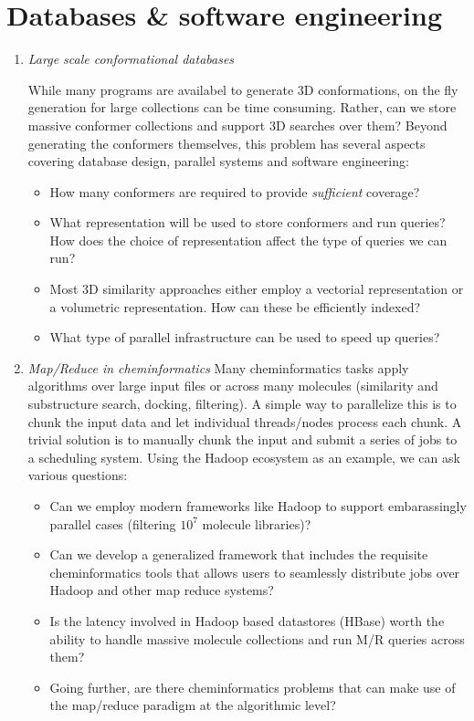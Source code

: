 \documentclass{sig-alternate}
\begin{document}
\section*{Databases \& software engineering}
\begin{enumerate}
\item \emph{Large scale conformational databases}

  While many programs are availabel to generate 3D conformations, on
  the fly generation for large collections can be time
  consuming. Rather, can we store massive conformer collections and
  support 3D searches over them? Beyond generating the conformers
  themselves, this problem has several aspects covering database
  design, parallel systems and software engineering:
  \begin{itemize}
  \item How many conformers are required to provide \emph{sufficient} coverage?
  \item What representation will be used to store conformers and run
    queries? How does the choice of representation affect the type of
    queries we can run?
  \item Most 3D similarity approaches either employ a vectorial
    representation or a volumetric representation. How can these be
    efficiently indexed?
  \item What type of parallel infrastructure can be used to speed up queries?
  \end{itemize}

\item \emph{Map/Reduce in cheminformatics}
  Many cheminformatics tasks apply algorithms over large input files
  or across many molecules (similarity and substructure search,
  docking, filtering). A simple way to parallelize this is to chunk
  the input data and let individual threads/nodes process each chunk. A
  trivial solution is to manually chunk the input and submit a series
  of jobs to a scheduling system. Using the Hadoop ecosystem as an
  example, we can ask various questions:
  \begin{itemize}
  \item Can we employ modern frameworks like Hadoop to support
    embarassingly parallel cases (filtering $10^7$ molecule libraries)?
  \item Can we develop a generalized framework that includes the
    requisite cheminformatics tools that allows users to seamlessly
    distribute jobs over Hadoop and other map reduce systems?
  \item Is the latency involved in Hadoop based datastores (HBase)
    worth the ability to handle massive molecule collections and run
    M/R queries across them? 
  \item Going further, are there cheminformatics problems that can make use
  of the map/reduce paradigm at the algorithmic level?
  \end{itemize}
\end{enumerate}
\end{document}
